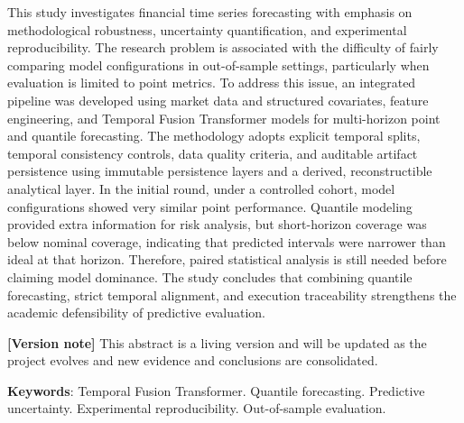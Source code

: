\begin{resumo}[Abstract]

This study investigates financial time series forecasting with emphasis on methodological robustness, uncertainty quantification, and experimental reproducibility. The research problem is associated with the difficulty of fairly comparing model configurations in out-of-sample settings, particularly when evaluation is limited to point metrics. To address this issue, an integrated pipeline was developed using market data and structured covariates, feature engineering, and Temporal Fusion Transformer models for multi-horizon point and quantile forecasting. The methodology adopts explicit temporal splits, temporal consistency controls, data quality criteria, and auditable artifact persistence using immutable persistence layers and a derived, reconstructible analytical layer. In the initial round, under a controlled cohort, model configurations showed very similar point performance. Quantile modeling provided extra information for risk analysis, but short-horizon coverage was below nominal coverage, indicating that predicted intervals were narrower than ideal at that horizon. Therefore, paired statistical analysis is still needed before claiming model dominance. The study concludes that combining quantile forecasting, strict temporal alignment, and execution traceability strengthens the academic defensibility of predictive evaluation.

\textbf{[Version note]} This abstract is a living version and will be updated as the project evolves and new evidence and conclusions are consolidated.

\textbf{Keywords}: Temporal Fusion Transformer. Quantile forecasting. Predictive uncertainty. Experimental reproducibility. Out-of-sample evaluation.
	
\end{resumo}
